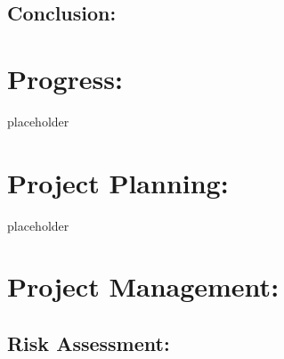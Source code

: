\documentclass{article}
\begin{document}

\subsection{ Conclusion: }











\section{Progress: }

placeholder 

\section{Project Planning: }

placeholder 

 

\section{ Project Management: }

\subsection{Risk Assessment: }
\end{document}
